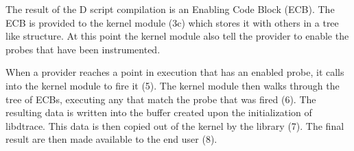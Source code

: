 The result of the D script compilation is an Enabling Code Block (ECB). The ECB is provided to the kernel module (3c) which stores it with others in a tree like structure. At this point the kernel module also tell the provider to enable the probes that have been instrumented.

When a provider reaches a point in execution that has an enabled probe, it calls into the kernel module to fire it (5). The kernel module then walks through the tree of ECBs, executing any that match the probe that was fired (6). The resulting data is written into the buffer created upon the initialization of libdtrace. This data is then copied out of the kernel by the library (7). The final result are then made available to the end user (8).
